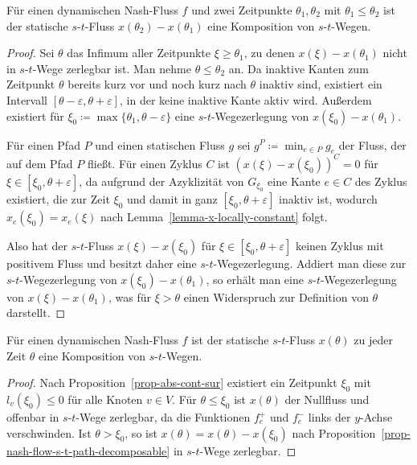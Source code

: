 \begin{proposition}\label{prop-nash-flow-s-t-path-decomposable}
	Für einen dynamischen Nash-Fluss $f$ und zwei Zeitpunkte $\theta_1,\theta_2$ mit $\theta_1 \leq \theta_2$ ist der statische $s$-$t$-Fluss $x(\theta_2) - x(\theta_1)$ eine Komposition von $s$-$t$-Wegen.
\end{proposition}
\begin{proof}
	Sei $\theta$ das Infimum aller Zeitpunkte $\xi\geq\theta_1$, zu denen $x(\xi) - x(\theta_1)$ nicht in $s$-$t$-Wege zerlegbar ist.
	Man nehme $\theta \leq \theta_2$ an.
	Da inaktive Kanten zum Zeitpunkt $\theta$ bereits kurz vor und noch kurz nach $\theta$ inaktiv sind, existiert ein Intervall $[\theta - \varepsilon, \theta + \varepsilon]$, in der keine inaktive Kante aktiv wird.
	Außerdem existiert für $\xi_0 \coloneq \max \{ \theta_1, \theta - \varepsilon \}$ eine $s$-$t$-Wegezerlegung von $x(\xi_0) - x(\theta_1)$.
	
	Für einen Pfad $P$ und einen statischen Fluss $g$ sei $g^P \coloneq \min_{e\in P} g_e$ der Fluss, der auf dem Pfad $P$ fließt.
	Für einen Zyklus $C$ ist $(x(\xi) - x(\xi_0))^C = 0$ für $\xi\in [\xi_0, \theta+\varepsilon]$, da aufgrund der Azyklizität von $G_{\xi_0}$ eine Kante $e\in C$ des Zyklus existiert, die zur Zeit $\xi_0$ und damit in ganz $[\xi_0, \theta+\varepsilon]$ inaktiv ist, wodurch $x_e(\xi_0) = x_e(\xi)$ nach Lemma~\ref{lemma-x-locally-constant} folgt.
	
	Also hat der $s$-$t$-Fluss $x(\xi) - x(\xi_0)$ für $\xi\in [\xi_0, \theta + \varepsilon]$ keinen Zyklus mit positivem Fluss und besitzt daher eine $s$-$t$-Wegezerlegung.
	Addiert man diese zur $s$-$t$-Wegezerlegung von $x(\xi_0) - x(\theta_1)$, so erhält man eine $s$-$t$-Wegezerlegung von $x(\xi) - x(\theta_1)$, was für $\xi > \theta$ einen Widerspruch zur Definition von $\theta$ darstellt.
\end{proof}

\begin{corollary}
	Für einen dynamischen Nash-Fluss $f$ ist der statische $s$-$t$-Fluss $x(\theta)$ zu jeder Zeit $\theta$ eine Komposition von $s$-$t$-Wegen.
\end{corollary}
\begin{proof}
	Nach Proposition~\ref{prop-abs-cont-sur} existiert ein Zeitpunkt $\xi_0$ mit $l_v(\xi_0) \leq 0$ für alle Knoten $v\in V$.
	Für $\theta \leq \xi_0$ ist $x(\theta)$ der Nullfluss und offenbar in $s$-$t$-Wege zerlegbar, da die Funktionen $f_e^+$ und $f_e^-$ links der $y$-Achse verschwinden.
	Ist $\theta > \xi_0$,  so ist $x(\theta)= x(\theta) - x(\xi_0)$ nach Proposition~\ref{prop-nash-flow-s-t-path-decomposable} in $s$-$t$-Wege zerlegbar.
\end{proof}